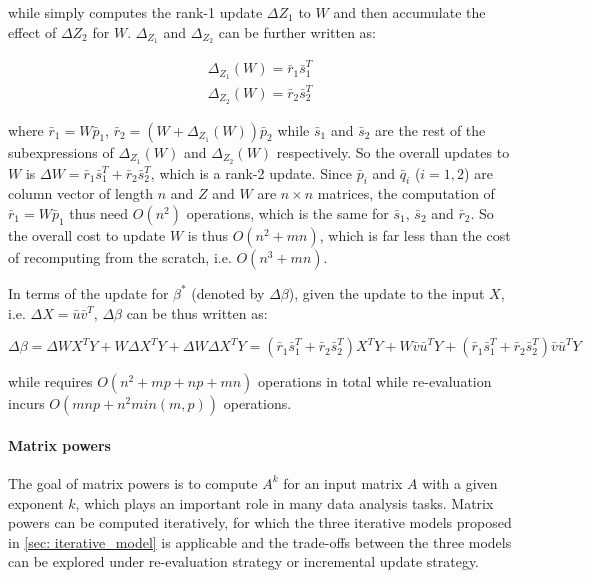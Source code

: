 while simply computes the rank-1 update $\Delta Z_1$ to $W$ and then accumulate the effect of $\Delta Z_2$ for $W$. $\Delta_{Z_1}$ and $\Delta_{Z_2}$ can be further written as:

\begin{equation}
\begin{split}
\Delta_{Z_1}(W) = \bar{r}_1\bar{s}_1^T\\    
\Delta_{Z_2}(W) = \bar{r}_2\bar{s}_2^T
\end{split}
\end{equation}

where $\bar{r}_1 = W\bar{p}_1$, $\bar{r}_2 = (W+\Delta_{Z_1}(W))\bar{p}_2$ while $\bar{s}_1$ and $\bar{s}_2$ are the rest of the subexpressions of $\Delta_{Z_1}(W)$ and $\Delta_{Z_2}(W)$ respectively. So the overall updates to $W$ is $\Delta W = \bar{r}_1\bar{s}_1^T + \bar{r}_2\bar{s}_2^T$, which is a rank-2 update.
Since $\bar{p}_i$ and $\bar{q}_i$ ($i=1,2$) are column vector of length $n$ and $Z$ and $W$ are $n \times n$ matrices, the computation of $\bar{r}_1 = W\bar{p}_1$ thus need $O(n^2)$ operations, which is the same for $\bar{s}_1$, $\bar{s}_2$ and $\bar{r}_2$. So the overall cost to update $W$ is thus $O(n^2 + mn)$, which is far less than the cost of recomputing from the scratch, i.e. $O(n^3 + mn)$.

In terms of the update for $\beta^*$ (denoted by $\Delta \beta$), given the update to the input $X$, i.e. $\Delta X=\bar{u}\bar{v}^T$, $\Delta \beta$ can be thus written as:

\begin{equation}
    \Delta \beta = \Delta WX^TY + W\Delta X^TY + \Delta W\Delta X^TY = (\bar{r}_1\bar{s}_1^T + \bar{r}_2\bar{s}_2^T)X^TY + W\bar{v}\bar{u}^TY + (\bar{r}_1\bar{s}_1^T + \bar{r}_2\bar{s}_2^T)\bar{v}\bar{u}^TY
\end{equation}

while requires $O(n^2 + mp + np + mn)$ operations in total while re-evaluation incurs $O(mnp + n^2min(m,p))$ operations.

\paragraph{Matrix powers}
The goal of matrix powers is to compute $A^k$ for an input matrix $A$ with a given exponent $k$, which plays an important role in many data analysis tasks. Matrix powers can be computed iteratively, for which the three iterative models proposed in \ref{sec: iterative_model} is applicable and the trade-offs between the three models can be explored under re-evaluation strategy or incremental update strategy.

